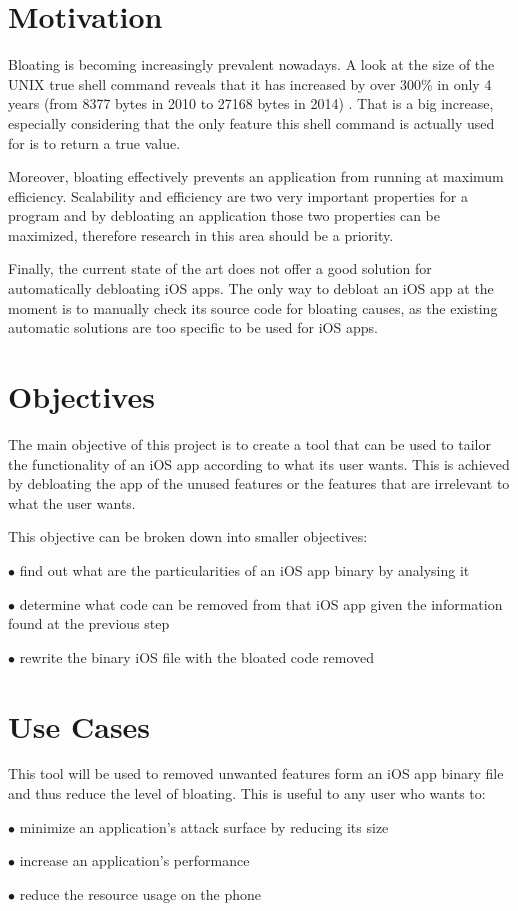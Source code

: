 \section{Motivation}
Bloating is becoming increasingly prevalent nowadays. A look at the size of the UNIX true shell command
reveals that it has increased by over 300\% in only 4 years (from 8377 bytes in 2010 to 27168 bytes in 2014) \cite{feast_bloat_mitigation}.
That is a big increase, especially considering that the only feature this shell command is actually used for is to return a true value.

Moreover, bloating effectively prevents an application from running at maximum efficiency. Scalability
and efficiency are two very important properties for a program and by debloating an application
those two properties can be maximized, therefore research in this area should be a priority.

Finally, the current state of the art does not offer a good solution for automatically debloating
iOS apps. The only way to debloat an iOS app at the moment is to manually
check its source code for bloating causes, as the existing automatic solutions are too specific
to be used for iOS apps.

\section{Objectives}
The main objective of this project is to create a tool that can be used to tailor the functionality
of an iOS app according to what its user wants. This is achieved by debloating the app of the unused
features or the features that are irrelevant to what the user wants.

This objective can be broken down into smaller objectives:
\begin{compactitem}
	\item[$\bullet$] find out what are the particularities of an iOS app binary by analysing it
	\item[$\bullet$] determine what code can be removed from that iOS app given the information found at the previous step
	\item[$\bullet$] rewrite the binary iOS file with the bloated code removed
\end{compactitem}

\section{Use Cases}
This tool will be used to removed unwanted features form an iOS app binary file and thus
reduce the level of bloating. This is useful to any user who wants to:
\begin{compactitem}
	\item[$\bullet$] minimize an application's attack surface by reducing its size
	\item[$\bullet$] increase an application's performance
	\item[$\bullet$] reduce the resource usage on the phone
\end{compactitem}

